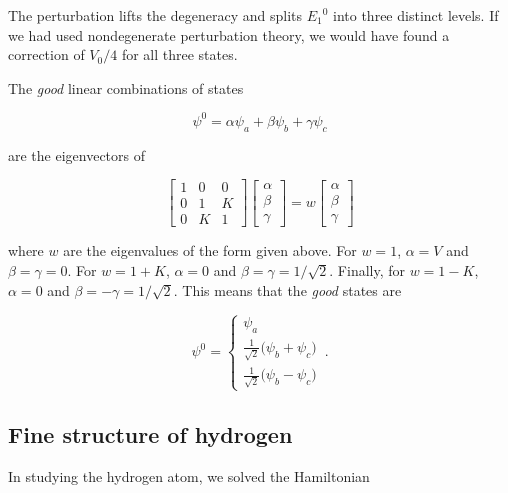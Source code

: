 \documentclass[12pt, titlepage]{article}
\begin{document}
\begin{mdframed}[backgroundcolor=gray!20]
The perturbation lifts the degeneracy and splits ${E_1}^0$ into three distinct levels. If we had used nondegenerate perturbation theory, we would have found a correction of $V_0/4$ for all three states.

The \textit{good} linear combinations of states 

\begin{equation*}
	\psi^0 = \alpha\psi_a + \beta\psi_b + \gamma\psi_c
\end{equation*}

are the eigenvectors of 

\begin{equation*}
	\begin{bmatrix}
	1 & 0 & 0 \\
	0 & 1 & K \\
	0 & K & 1 
	\end{bmatrix}
	\begin{bmatrix}
	\alpha \\ \beta \\ \gamma
	\end{bmatrix}
	= w
		\begin{bmatrix}
	\alpha \\ \beta \\ \gamma
	\end{bmatrix}
\end{equation*}

where $w$ are the eigenvalues of the form given above. For $w=1$, $\alpha = V$ and $\beta=\gamma=0$. For $w = 1+K$, $\alpha = 0$ and $\beta = \gamma = 1/\sqrt{2}$. Finally, for $w = 1-K$, $\alpha = 0$ and $\beta = -\gamma = 1/\sqrt{2}$. This means that the \textit{good} states are

\begin{equation*}
	\psi^0 = \left\{
	\begin{array}{l}
	\psi_a \\[4pt]
	\frac{1}{\sqrt{2}}\bigl(\psi_b + \psi_c\bigr) \\[4pt]
	\frac{1}{\sqrt{2}}\bigl(\psi_b - \psi_c\bigr)
	\end{array}
	\right. \,.
\end{equation*}
\end{mdframed}

\subsection{Fine structure of hydrogen}
In studying the hydrogen atom, we solved the Hamiltonian
\end{document}
